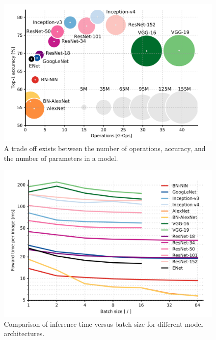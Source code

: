 \documentclass[10pt,journal,compsoc]{IEEEtran}
\begin{document}
		\begin{figure}[h]
			\centering
			\includegraphics[scale=1]{tradeoff}
			\caption{A trade off exists between the number of operations, accuracy, and the number of parameters in a model.}
		\end{figure}
		
		\begin{figure}[h]
			\centering
			\includegraphics[scale=1]{tradeoff_2}
			\caption{Comparison of inference time versus batch size for different model architectures.}
		\end{figure}
		
\end{document}
